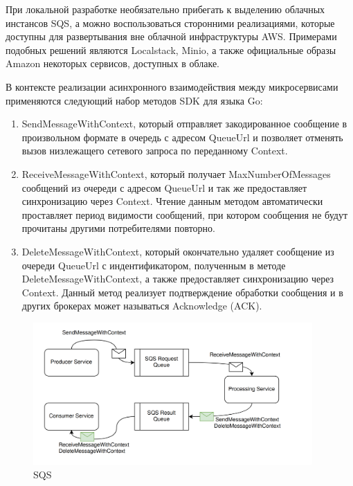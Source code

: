 При локальной разработке необязательно прибегать к выделению облачных инстансов SQS, а можно воспользоваться сторонними реализациями, которые доступны для развертывания вне облачной инфраструктуры AWS. Примерами подобных решений являются Localstack, Minio, а также официальные образы Amazon
некоторых сервисов, доступных в облаке.

В контексте реализации асинхронного взаимодействия между микросервисами применяются следующий набор методов SDK для языка Go:
\begin{enumerate}
    \item SendMessageWithContext, который отправляет закодированное сообщение в произвольном формате в очередь с адресом QueueUrl и позволяет отменять вызов низлежащего сетевого запроса по переданному Context.
    \item ReceiveMessageWithContext, который получает MaxNumberOfMessages сообщений из очереди с адресом QueueUrl и так же предоставляет синхронизацию через Context.
    Чтение данным методом автоматически проставляет период видимости сообщений, при котором сообщения не будут прочитаны другими 
    потребителями повторно.
    \item DeleteMessageWithContext, который окончательно удаляет сообщение из очереди QueueUrl с индентификатором, 
    полученным в методе DeleteMessageWithContext, а также предоставляет синхронизацию через Context.
     Данный метод реализует подтверждение обработки сообщения и в других 
    брокерах может называться Acknowledge (ACK).
\end{enumerate}

\begin{figure}[H]
  \centering
  \includegraphics[width=0.95\textwidth]{img/sqs.png}
  \caption{SQS}
    \label{fig:sqs}
\end{figure}
